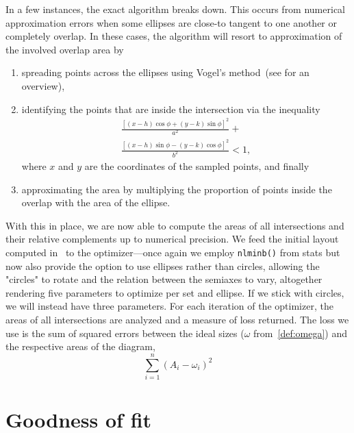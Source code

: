 \documentclass[
  oneside,
  openany,
  numbers=noendperiod,
  parskip=half,
  bibliography=totoc
]{scrbook}\usepackage[]{graphicx}\usepackage{xcolor}
\newcommand{\pkg}[1]{{\fontseries{b}\selectfont #1}}
\newcommand{\code}[1]{\texttt{#1}}
\begin{document}
In a few instances,
the exact algorithm breaks down. This occurs from numerical approximation
errors when some ellipses are close-to tangent to one another or completely
overlap. In these cases, the algorithm will resort to approximation of the
involved overlap area by
\begin{enumerate}
\item spreading points across the ellipses using Vogel's
  method~(see  for an overview),
\item identifying the points that are inside the intersection via the inequality
  \begin{equation*}
  \begin{multlined}
  \frac{\left[ (x-h)\cos{\phi}+(y-k)\sin{\phi} \right]^2}{a^2} + \\
    \frac{\left[(x-h) \sin{\phi}-(y-k)\cos{\phi}\right]^2}{b^2} < 1,
  \end{multlined}
  \end{equation*}
  where $x$ and $y$ are the coordinates of the sampled points, and finally
\item approximating the area by multiplying the proportion of points inside the
  overlap with the area of the ellipse.
\end{enumerate}

With this in place, we are now able to compute the areas of all intersections
and their relative complements up to numerical precision. We feed the initial
layout computed in~ to the optimizer---once again
we employ \code{nlminb()} from \pkg{stats} but now also provide the option to
use ellipses rather than circles, allowing the "circles"
to rotate and the relation between the semiaxes to vary, altogether
rendering five parameters to optimize per set and ellipse. If we stick with
circles, we will instead have three parameters. For each iteration of
the optimizer, the areas of all intersections are analyzed and a measure of loss
returned. The loss we use is the sum of squared errors between the ideal sizes
($\omega$ from~\cref{def:omega}) and the respective areas of the diagram,
\begin{equation}
\sum_{i=1}^{n}  (A_i-\omega_i)^2
\label{eq:loss}
\end{equation}

\section{Goodness of fit}
\label{sec:gof}
\end{document}
